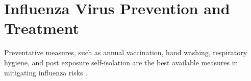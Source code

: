 \section{Influenza Virus Prevention and Treatment}

Preventative measures, such as annual vaccination, hand washing, respiratory hygiene, and post exposure self-isolation are the best available measures in mitigating influenza risks \cite{influenza_seasonal_2018}.

